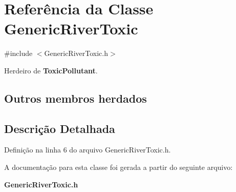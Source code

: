 \section{Referência da Classe Generic\+River\+Toxic}
\label{class_generic_river_toxic}


{\ttfamily \#include $<$Generic\+River\+Toxic.\+h$>$}



Herdeiro de {\bf Toxic\+Pollutant}.

\subsection*{Outros membros herdados}


\subsection{Descrição Detalhada}


Definição na linha 6 do arquivo Generic\+River\+Toxic.\+h.



A documentação para esta classe foi gerada a partir do seguinte arquivo\+:\begin{DoxyCompactItemize}
\item 
{\bf Generic\+River\+Toxic.\+h}\end{DoxyCompactItemize}
